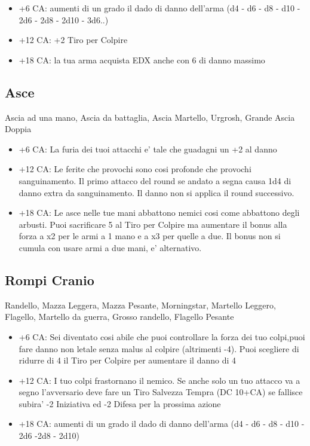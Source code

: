\documentclass[a4paper,11pt,twoside,openany]{book}
\begin{document}
	\begin{itemize}
		\item +6 CA: aumenti di un grado il dado di danno dell'arma (d4 - d6 - d8 - d10 - 2d6 - 2d8 - 2d10 - 3d6..)
		
		\item +12 CA: +2 Tiro per Colpire
		
		\item +18 CA: la tua arma acquista EDX anche con 6 di danno massimo 
	\end{itemize}
	
	\subsection{Asce} Ascia ad una mano, Ascia da battaglia, Ascia Martello, Urgrosh, Grande Ascia Doppia
	
	\begin{itemize}
		
		\item +6 CA: La furia dei tuoi attacchi e' tale che guadagni un +2 al danno
		
		\item +12 CA: Le ferite che provochi sono cosi profonde che provochi sanguinamento. Il primo attacco del round se andato a segna causa 1d4 di danno extra da sanguinamento. Il danno non si applica il round successivo.
		
		\item +18 CA: Le asce nelle tue mani abbattono nemici cosi come abbattono degli arbusti. Puoi sacrificare 5 al Tiro per Colpire ma aumentare il bonus alla forza a x2 per le armi a 1 mano e a x3 per quelle a due. Il bonus non si cumula con usare armi a due mani, e' alternativo.
		
	\end{itemize}
	
	\subsection{Rompi Cranio} Randello, Mazza Leggera, Mazza Pesante, Morningstar,
	Martello Leggero, Flagello, Martello da guerra, Grosso randello, Flagello
	Pesante
	
	\begin{itemize}
		\item +6 CA: Sei diventato cosi abile che puoi controllare la forza dei tuo colpi,puoi fare danno non letale senza malus al colpire (altrimenti -4). Puoi scegliere di ridurre di 4 il Tiro per Colpire per aumentare il danno di 4 
		
		\item +12 CA: I tuo colpi frastornano il nemico. Se anche solo un tuo attacco va a segno l'avversario deve fare un Tiro Salvezza Tempra (DC 10+CA) se fallisce subira' -2 Iniziativa ed -2 Difesa per la prossima azione 
		
		\item +18 CA: aumenti di un grado il dado di danno dell'arma (d4 - d6 - d8 - d10 - 2d6 -2d8 - 2d10)
	\end{itemize}
	
\end{document}
